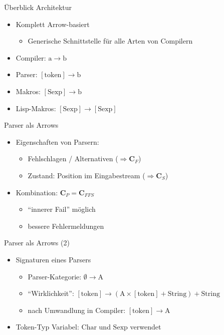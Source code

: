 \documentclass{beamer}
\newcommand{\pfeil}{\item[$\Rightarrow$]}
\newcommand\ato{\rightarrow} %
\begin{document}
\begin{frame}{Überblick Architektur}
  \begin{itemize}
  \item Komplett Arrow-basiert
    \begin{itemize}
      \pfeil Generische Schnittstelle für alle Arten von Compilern
    \end{itemize}
  \item Compiler: $\mathrm{a} \ato \mathrm{b}$
  \item Parser: $\mathrm{[token]} \ato \mathrm{b}$ 
  \item Makros: $\mathrm{[Sexp]} \ato \mathrm{b}$ 
  \item Lisp-Makros: $\mathrm{[Sexp]} \ato \mathrm{[Sexp]}$
  \end{itemize}
\end{frame}

\begin{frame}{Parser als Arrows}
  \begin{itemize}
  \item Eigenschaften von Parsern:
    \begin{itemize}
    \item Fehlschlagen / Alternativen ($\Rightarrow \mathbf{C}_F$)
    \item Zustand: Position im Eingabestream ($\Rightarrow \mathbf{C}_S$)
    \end{itemize}
  \item Kombination: $\mathbf{C}_P = \mathbf{C}_{FFS}$
    \begin{itemize}
    \item ``innerer Fail'' möglich
      \pfeil bessere Fehlermeldungen
    \end{itemize}
  \end{itemize}
\end{frame}

\begin{frame}{Parser als Arrows (2)}
  \begin{itemize}
  \item Signaturen eines Parsers
    \begin{itemize}
    \item Parser-Kategorie: $\emptyset \ato \mathrm{A}$
    \item ``Wirklichkeit'': $[\mathrm{token}] \ato (\mathrm{A} \times
      [\mathrm{token}] + \mathrm{String}) + \mathrm{String}$
    \item nach Umwandlung in Compiler: $[\mathrm{token}] \ato \mathrm{A}$
    \end{itemize}  
  \item Token-Typ Variabel: $\mathrm{Char}$ und $\mathrm{Sexp}$
    verwendet
  \end{itemize}
\end{frame}
\end{document}
